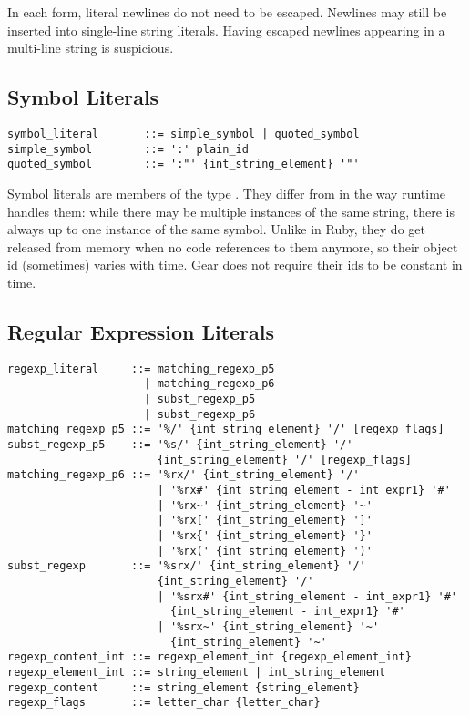 In each form, literal newlines do not need to be escaped. Newlines may still be inserted into single-line string literals. Having escaped newlines appearing in a multi-line string is suspicious. 





\subsection{Symbol Literals}
\label{sec:symbolliterals}

\syntax\begin{lstlisting}
symbol_literal       ::= simple_symbol | quoted_symbol
simple_symbol        ::= ':' plain_id
quoted_symbol        ::= ':"' {int_string_element} '"'
\end{lstlisting}

Symbol literals are members of the type \lstinline@Symbol@. They differ from  in the way runtime handles them: while there may be multiple instances of the same string, there is always up to one instance of the same symbol. Unlike in Ruby, they do get released from memory when no code references to them anymore, so their object id (sometimes) varies with time. Gear does not require their ids to be constant in time. 









\subsection{Regular Expression Literals}
\label{sec:regexpliterals}

\syntax\begin{lstlisting}
regexp_literal     ::= matching_regexp_p5
                     | matching_regexp_p6
                     | subst_regexp_p5
                     | subst_regexp_p6
matching_regexp_p5 ::= '%/' {int_string_element} '/' [regexp_flags]
subst_regexp_p5    ::= '%s/' {int_string_element} '/' 
                       {int_string_element} '/' [regexp_flags]
matching_regexp_p6 ::= '%rx/' {int_string_element} '/'
	                   | '%rx#' {int_string_element - int_expr1} '#'
	                   | '%rx~' {int_string_element} '~'
	                   | '%rx[' {int_string_element} ']'
	                   | '%rx{' {int_string_element} '}'
	                   | '%rx(' {int_string_element} ')'
subst_regexp       ::= '%srx/' {int_string_element} '/'
                       {int_string_element} '/'
	                   | '%srx#' {int_string_element - int_expr1} '#'
	                     {int_string_element - int_expr1} '#'
	                   | '%srx~' {int_string_element} '~'
	                     {int_string_element} '~'
regexp_content_int ::= regexp_element_int {regexp_element_int}
regexp_element_int ::= string_element | int_string_element
regexp_content     ::= string_element {string_element}
regexp_flags       ::= letter_char {letter_char}
\end{lstlisting}

